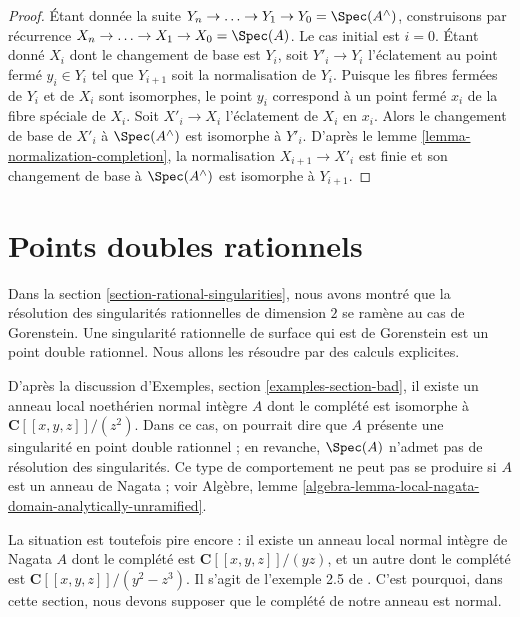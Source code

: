 \begin{proof} Étant donnée la suite $Y_n \to \ldots \to Y_1 \to Y_0 = \Spec(A^\wedge)$, construisons par récurrence $X_n \to \ldots \to X_1 \to X_0 = \Spec(A)$. Le cas initial est $i = 0$. Étant donné $X_i$ dont le changement de base est $Y_i$, soit $Y'_i \to Y_i$ l'éclatement au point fermé $y_i \in Y_i$ tel que $Y_{i + 1}$ soit la normalisation de $Y_i$. Puisque les fibres fermées de $Y_i$ et de $X_i$ sont isomorphes, le point $y_i$ correspond à un point fermé $x_i$ de la fibre spéciale de $X_i$. Soit $X'_i \to X_i$ l'éclatement de $X_i$ en $x_i$. Alors le changement de base de $X'_i$ à $\Spec(A^\wedge)$ est isomorphe à $Y'_i$. D'après le lemme \ref{lemma-normalization-completion}, la normalisation $X_{i + 1} \to X'_i$ est finie et son changement de base à $\Spec(A^\wedge)$ est isomorphe à $Y_{i + 1}$. \end{proof}














\section{Points doubles rationnels} \label{section-rational-double-points}

\noindent Dans la section \ref{section-rational-singularities}, nous avons montré que la résolution des singularités rationnelles de dimension $2$ se ramène au cas de Gorenstein. Une singularité rationnelle de surface qui est de Gorenstein est un point double rationnel. Nous allons les résoudre par des calculs explicites.

\medskip\noindent D'après la discussion d'Exemples, section \ref{examples-section-bad}, il existe un anneau local noethérien normal intègre $A$ dont le complété est isomorphe à $\mathbf{C}[[x, y, z]]/(z^2)$. Dans ce cas, on pourrait dire que $A$ présente une singularité en point double rationnel ; en revanche, $\Spec(A)$ n'admet pas de résolution des singularités. Ce type de comportement ne peut pas se produire si $A$ est un anneau de Nagata ; voir Algèbre, lemme \ref{algebra-lemma-local-nagata-domain-analytically-unramified}.

\medskip\noindent La situation est toutefois pire encore : il existe un anneau local normal intègre de Nagata $A$ dont le complété est $\mathbf{C}[[x, y, z]]/(yz)$, et un autre dont le complété est $\mathbf{C}[[x, y, z]]/(y^2 - z^3)$. Il s'agit de l'exemple 2.5 de \cite{Nishimura-few}. C'est pourquoi, dans cette section, nous devons supposer que le complété de notre anneau est normal.

